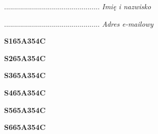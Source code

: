 \begin{turn}{90}\begin{minipage}{\linewidth} \vspace{20mm} ................................................  \textit{Imię i nazwisko}\end{minipage}\end{turn}

\begin{turn}{90}\begin{minipage}{\linewidth} \vspace{20mm} ................................................  \textit{Adres e-mailowy}\end{minipage}\end{turn}

\begin{turn}{90}\huge \begin{minipage}{\linewidth} \vspace{10mm}\textbf{S165A354C}\end{minipage}\end{turn}

\begin{turn}{90}\huge \begin{minipage}{\linewidth} \vspace{10mm}\textbf{S265A354C}\end{minipage}\end{turn}

\begin{turn}{90}\huge \begin{minipage}{\linewidth} \vspace{10mm}\textbf{S365A354C}\end{minipage}\end{turn}

\begin{turn}{90}\huge \begin{minipage}{\linewidth} \vspace{10mm}\textbf{S465A354C}\end{minipage}\end{turn}

\begin{turn}{90}\huge \begin{minipage}{\linewidth} \vspace{10mm}\textbf{S565A354C}\end{minipage}\end{turn}

\begin{turn}{90}\huge \begin{minipage}{\linewidth} \vspace{10mm}\textbf{S665A354C}\end{minipage}\end{turn}


